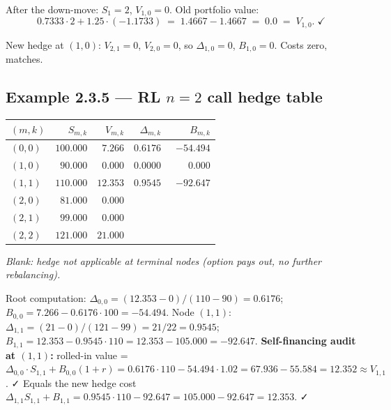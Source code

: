 \documentclass[
  10pt,
  twoside]{book}
\newcounter{none} %
\begin{document}
After the down-move: \(S_1=2\), \(V_{1,0}=0\). Old portfolio value: \[
0.7333\cdot 2 + 1.25\cdot(-1.1733) \;=\; 1.4667 - 1.4667 \;=\; 0.0 \;=\; V_{1,0}.\;\checkmark
\]

New hedge at \((1,0)\): \(V_{2,1}=0\), \(V_{2,0}=0\), so
\(\Delta_{1,0}=0\), \(B_{1,0}=0\). Costs zero, matches.

\subsection{\texorpdfstring{Example 2.3.5 --- RL \(n=2\) call hedge
table}{Example 2.3.5 --- RL n=2 call hedge table}}\label{example-2.3.5-rl-n2-call-hedge-table}

{\def\LTcaptype{none} %
\begin{table}[H]
\centering
\begin{tabular}{|l|r|r|r|r|}
\toprule
\((m,k)\) & \(S_{m,k}\) & \(V_{m,k}\) & \(\Delta_{m,k}\) & \(B_{m,k}\) \\
\midrule



\((0,0)\) & \(100.000\) & \(\phantom{0}7.266\) & \(0.6176\) &
\(-54.494\) \\
\((1,0)\) & \(\phantom{0}90.000\) & \(\phantom{0}0.000\) & \(0.0000\) &
\(\phantom{-00}0.000\) \\
\((1,1)\) & \(110.000\) & \(12.353\) & \(0.9545\) & \(-92.647\) \\
\((2,0)\) & \(\phantom{0}81.000\) & \(\phantom{0}0.000\) & & \\
\((2,1)\) & \(\phantom{0}99.000\) & \(\phantom{0}0.000\) & & \\
\((2,2)\) & \(121.000\) & \(21.000\) & & \\
\bottomrule
\end{tabular}
\end{table}
}

\emph{Blank: hedge not applicable at terminal nodes (option pays out, no
further rebalancing).}

Root computation: \(\Delta_{0,0}=(12.353-0)/(110-90)=0.6176\);
\(B_{0,0}=7.266-0.6176\cdot 100=-54.494\). Node \((1,1)\):
\(\Delta_{1,1}=(21-0)/(121-99)=21/22=0.9545\);
\(B_{1,1}=12.353-0.9545\cdot 110=12.353-105.000=-92.647\).
\textbf{Self-financing audit at \((1,1)\):} rolled-in value =
\(\Delta_{0,0}\cdot S_{1,1}+B_{0,0}(1+r)=0.6176\cdot 110-54.494\cdot 1.02=67.936-55.584=12.352\approx V_{1,1}\).
✓ Equals the new hedge cost
\(\Delta_{1,1}S_{1,1}+B_{1,1}=0.9545\cdot 110-92.647=105.000-92.647=12.353\).
✓
\end{document}
